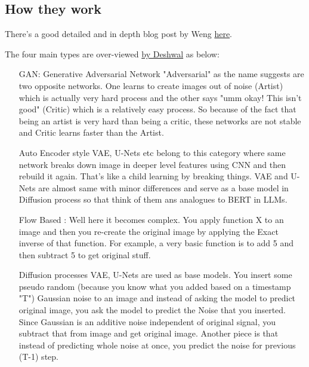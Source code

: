\subsection{How they work}
There's a good detailed and in depth blog post by Weng \href{https://lilianweng.github.io/posts/2021-07-11-diffusion-models/#classifier-free-guidance}{here}.

The four main types are over-viewed \href{https://www.linkedin.com/feed/update/urn:li:activity:7088752096853803008/}{by Deshwal} as below:

\begin{itemize}

\item [GAN: Generative Adversarial Network] "Adversarial" as the name suggests are two opposite networks. One learns to create images out of noise (Artist) which is actually very hard process and the other says "umm okay! This isn't good" (Critic) which is a relatively easy process. So because of the fact that being an artist is very hard than being a critic, these networks are not stable and Critic learns faster than the Artist.

\item [Auto Encoder style] VAE, U-Nets etc belong to this category where same network breaks down image in deeper level features using CNN and then rebuild it again. That's like a child learning by breaking things. VAE and U-Nets are almost same with minor differences and serve as a base model in Diffusion process so that think of them ans analogues to BERT in LLMs.

\item [Flow Based]: Well here it becomes complex. You apply function X to an image and then you re-create the original image by applying the Exact inverse of that function. For example, a very basic function is to add 5 and then subtract 5 to get original stuff. 

\item [Diffusion processes] VAE, U-Nets are used as base models. You insert some pseudo random (because you know what you added based on a timestamp "T") Gaussian noise to an image and instead of asking the model to predict original image, you ask the model to predict the Noise that you inserted. Since Gaussian is an additive noise independent of original signal, you subtract that from image and get original image. Another piece is that instead of predicting whole noise at once, you predict the noise for previous (T-1) step.
\end{itemize}

